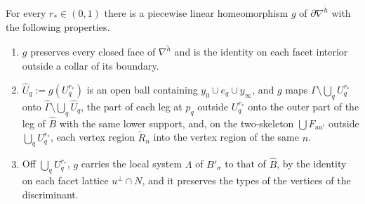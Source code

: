 \begin{lemma}\label{lem:resmove}
For every $r_*\in(0,1)$ there is a piecewise linear homeomorphism $g$ of $\partial\nabla^{\check h}$ with the following
properties.
\begin{enumerate}
\item $g$ preserves every closed face of $\nabla^{\check h}$ and is the identity on each facet interior outside a collar of
its boundary.
\item $\widehat U_q:=g(U_q^{r_*})$ is an open ball containing $y_0\cup e_q\cup y_\infty$, and $g$ maps
$\Gamma\setminus\bigcup_qU_q^{r_*}$ onto $\widehat\Gamma\setminus\bigcup_q\widehat U_q$, the part of each leg at $p_q$
outside $U^{r_*}_q$ onto the outer part of the leg of $\widehat B$ with the same lower support, and, on the two-skeleton
$\bigcup F_{uu'}$ outside $\bigcup_qU^{r_*}_q$, each vertex region $\widetilde R_n$ into the vertex region of the same $n$.
\item Off $\bigcup_qU_q^{r_*}$, $g$ carries the local system $\Lambda$ of $B'_\sigma$ to that of $\widehat B$, by the
identity on each facet lattice $u^\perp\cap N$, and it preserves the types of the vertices of the discriminant.
\end{enumerate}
\end{lemma}
